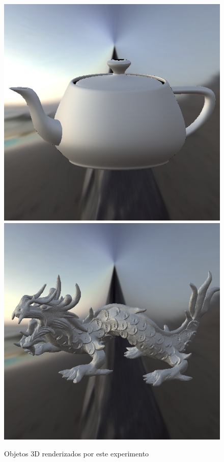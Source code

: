 \begin{figure}[H]
    \caption{\small{Objetos 3D renderizados por este experimento}}\label{fig-ward-objetcs}
  \includegraphics[width=\linewidth]{./Imagens/brdfs/ward-teapot.png}
\endminipage\hfill
{}
  \includegraphics[width=\linewidth]{./Imagens/brdfs/ward-dragon.png}

\end{figure}
